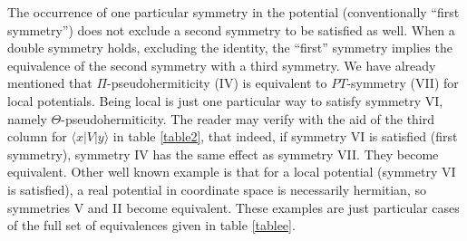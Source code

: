  The occurrence of one particular symmetry in the potential (conventionally  ``first symmetry'')
 does not exclude a second symmetry to be satisfied as well.
 When a double symmetry holds, excluding the identity,  the ``first'' symmetry  implies the equivalence of the second symmetry with a third symmetry.
 We have already mentioned that $\Pi$-pseudohermiticity (IV) is equivalent to $PT$-symmetry (VII) for local potentials.
 Being local is just one particular way to satisfy symmetry VI, namely $\Theta$-pseudohermiticity. The reader may verify with the aid of
 the third column for $\langle x|V|y\rangle$  in table \ref{table2}, that indeed, if symmetry VI is satisfied (first symmetry), symmetry IV has the same effect as symmetry VII.
 They become equivalent. Other well known example is  that for a local potential (symmetry VI is satisfied), a real potential in coordinate space  is necessarily hermitian,
 so symmetries V and II become equivalent.
 These examples are just particular cases of the full set of equivalences given in table \ref{tablee}.
%
%
%
%
%
%
%
%
